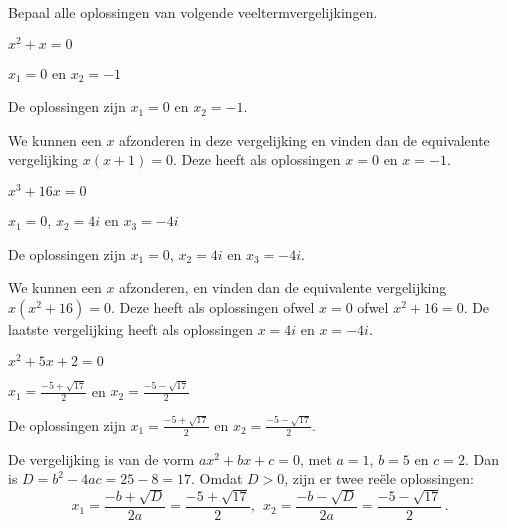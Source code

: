\documentclass{ximera}
\begin{document}
	
	\begin{exercise}
		\begin{statement}
		Bepaal alle oplossingen van volgende veeltermvergelijkingen.
		\end{statement}
		
		
		\begin{question}
			$ x^2 + x = 0$
			\begin{uitkomst} $x_1 = 0$ en $x_2 = -1$
				\end{uitkomst}
			\begin{oplossing}
				De oplossingen zijn $x_1 = 0$ en $x_2 = -1$.
				
				We kunnen een $x$ afzonderen in deze vergelijking en vinden dan de equivalente vergelijking $x(x+1) = 0$. Deze heeft als oplossingen $x=0$ en $x=-1$.
			\end{oplossing}
		\end{question}
		
		\begin{question}
			$ x^3 + 16x = 0$
			\begin{uitkomst} $x_1 = 0$, $x_2 = 4i$ en $x_3 = -4i$
				\end{uitkomst}
			\begin{oplossing}
				De oplossingen zijn $x_1 = 0$, $x_2 = 4i$ en $x_3 = -4i$.
				
				We kunnen een $x$ afzonderen, en vinden dan de equivalente vergelijking $x(x^2+16)=0$. Deze heeft als oplossingen ofwel $x=0$ ofwel $x^2 + 16 = 0$. De laatste vergelijking heeft als oplossingen $x=4i$ en $x=-4i$.
			\end{oplossing}
		\end{question}
		
		
		\begin{question}
			$ x^2 + 5x + 2 = 0$
			\begin{uitkomst} $x_1 = \frac{-5 + \sqrt{17}}{2}$ en $x_2 = \frac{-5 - \sqrt{17}}{2}$
			\end{uitkomst}
			\begin{oplossing}
				De oplossingen zijn $x_1 = \frac{-5 + \sqrt{17}}{2}$ en $x_2 = \frac{-5 - \sqrt{17}}{2}$.
				
				De vergelijking is van de vorm $ax^2 + bx + c = 0$, met $a=1$, $b=5$ en $c=2$. Dan is $D = b^2 - 4ac = 25-8 = 17$. Omdat $D > 0$, zijn er twee reële oplossingen:
				$$
				x_1 = \frac{-b + \sqrt{D}}{2a} = \frac{-5 + \sqrt{17}}{2}, \ \ x_2 = \frac{-b - \sqrt{D}}{2a} = \frac{-5 - \sqrt{17}}{2} \, .
				$$
			\end{oplossing}
		\end{question}
		

\end{exercise}
\end{document}

